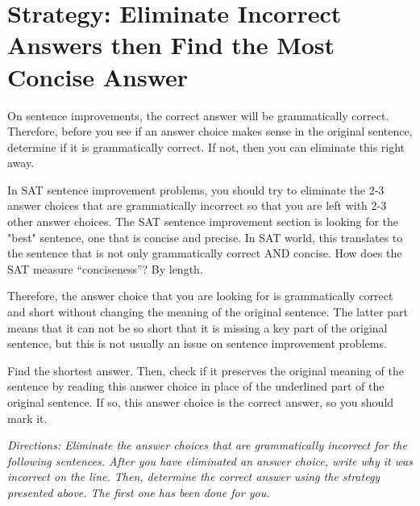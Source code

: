 \section{Strategy: Eliminate Incorrect Answers then Find the Most Concise Answer}

On sentence improvements, the correct answer will be grammatically correct. Therefore, before
you see if an answer choice makes sense in the original sentence, determine if it is grammatically
correct. If not, then you can eliminate this right away.

In SAT sentence improvement problems, you should try to eliminate the 2-3 answer choices that are grammatically incorrect so that you are left with 2-3 other answer choices. The SAT sentence improvement section is looking for the "best" sentence, one that is concise and precise. In SAT world, this translates to the sentence that is not only grammatically correct AND concise. How does the SAT measure ``conciseness''? By length.

\bigskip
Therefore, the answer choice that you are looking for is grammatically correct and short without changing the meaning of the original sentence. The latter part means that it can not be so short that it is missing a key part of the original sentence,
but this is not usually an issue on sentence improvement problems.

\bigskip
Find the shortest answer. Then, check if it preserves the original meaning of the sentence by reading this answer choice in place of the underlined part of the original sentence. If so, this answer choice is the correct answer, so you should mark it.

\bigskip
\textit{Directions: Eliminate the answer choices that are grammatically incorrect for the following sentences. After you have eliminated an answer choice, write why it was incorrect on the line. Then, determine the correct answer using the strategy presented above. The first one has been done for you.}


